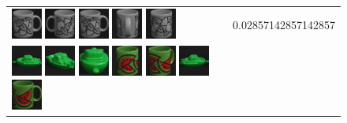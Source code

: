 \begin{figure}[tbp]
\begin{center}
\begin{tabular}{m{11cm} | m{3cm} |}
\includegraphics[width=1cm]{coil/beeld-48.eps}
\includegraphics[width=1cm]{coil/beeld-51.eps}
\includegraphics[width=1cm]{coil/beeld-48.eps}
\includegraphics[width=1cm]{coil/beeld-50.eps}
\includegraphics[width=1cm]{coil/beeld-52.eps}
& {\scriptsize 0.02857142857142857}
\\
\includegraphics[width=1cm]{coil/beeld-54.eps}
\includegraphics[width=1cm]{coil/beeld-58.eps}
\includegraphics[width=1cm]{coil/beeld-56.eps}
\includegraphics[width=1cm]{coil/beeld-32.eps}
\includegraphics[width=1cm]{coil/beeld-33.eps}
\includegraphics[width=1cm]{coil/beeld-55.eps}
\includegraphics[width=1cm]{coil/beeld-30.eps}

\end{tabular}
\end{center}
\end{figure}
